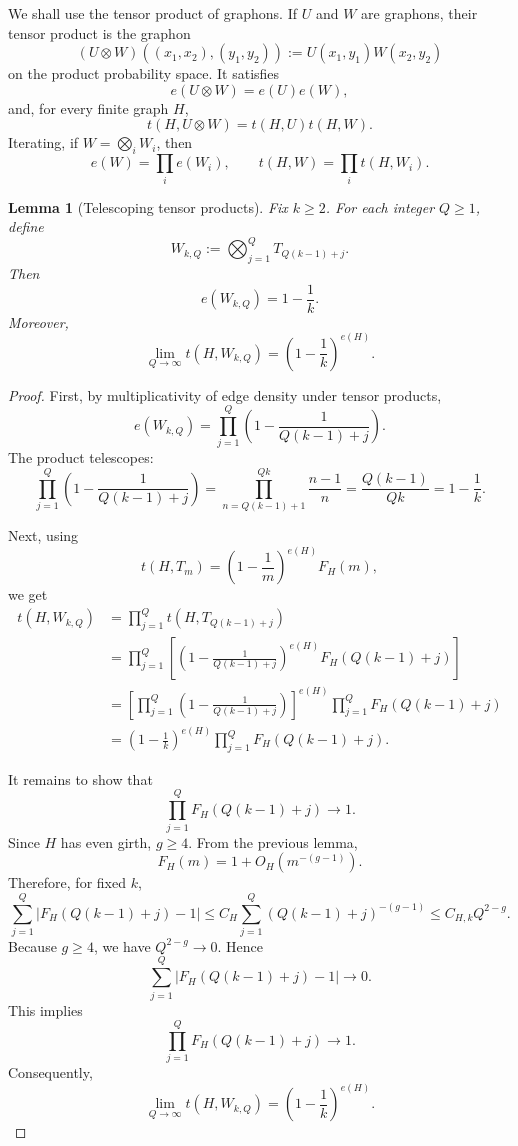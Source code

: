 \documentclass[11pt]{article}
\newtheorem{lemma}{Lemma}
\begin{document}
We shall use the tensor product of graphons.  If \(U\) and \(W\) are
graphons, their tensor product is the graphon
\[
    (U\otimes W)((x_1,x_2),(y_1,y_2))
    :=
    U(x_1,y_1)W(x_2,y_2)
\]
on the product probability space.  It satisfies
\[
    e(U\otimes W)=e(U)e(W),
\]
and, for every finite graph \(H\),
\[
    t(H,U\otimes W)=t(H,U)t(H,W).
\]
Iterating, if \(W=\bigotimes_i W_i\), then
\[
    e(W)=\prod_i e(W_i),
    \qquad
    t(H,W)=\prod_i t(H,W_i).
\]

\begin{lemma}[Telescoping tensor products]
Fix \(k\geq 2\).  For each integer \(Q\geq 1\), define
\[
    W_{k,Q}
    :=
    \bigotimes_{j=1}^{Q}
    T_{Q(k-1)+j}.
\]
Then
\[
    e(W_{k,Q})=1-\frac1k.
\]
Moreover,
\[
    \lim_{Q\to\infty} t(H,W_{k,Q})
    =
    \left(1-\frac1k\right)^{e(H)}.
\]
\end{lemma}

\begin{proof}
First, by multiplicativity of edge density under tensor products,
\[
    e(W_{k,Q})
    =
    \prod_{j=1}^{Q}
    \left(1-\frac{1}{Q(k-1)+j}\right).
\]
The product telescopes:
\[
    \prod_{j=1}^{Q}
    \left(1-\frac{1}{Q(k-1)+j}\right)
    =
    \prod_{n=Q(k-1)+1}^{Qk}
    \frac{n-1}{n}
    =
    \frac{Q(k-1)}{Qk}
    =
    1-\frac1k.
\]

Next, using
\[
    t(H,T_m)
    =
    \left(1-\frac1m\right)^{e(H)}F_H(m),
\]
we get
\[
\begin{aligned}
    t(H,W_{k,Q})
    &=
    \prod_{j=1}^{Q}
    t\!\left(H,T_{Q(k-1)+j}\right)\\
    &=
    \prod_{j=1}^{Q}
    \left[
        \left(
            1-\frac{1}{Q(k-1)+j}
        \right)^{e(H)}
        F_H(Q(k-1)+j)
    \right]\\
    &=
    \left[
        \prod_{j=1}^{Q}
        \left(
            1-\frac{1}{Q(k-1)+j}
        \right)
    \right]^{e(H)}
    \prod_{j=1}^{Q} F_H(Q(k-1)+j)\\
    &=
    \left(1-\frac1k\right)^{e(H)}
    \prod_{j=1}^{Q} F_H(Q(k-1)+j).
\end{aligned}
\]

It remains to show that
\[
    \prod_{j=1}^{Q} F_H(Q(k-1)+j)\to 1.
\]
Since \(H\) has even girth, \(g\geq 4\).  From the previous lemma,
\[
    F_H(m)=1+O_H(m^{-(g-1)}).
\]
Therefore, for fixed \(k\),
\[
    \sum_{j=1}^{Q}
    \left|
        F_H(Q(k-1)+j)-1
    \right|
    \leq
    C_H
    \sum_{j=1}^{Q}
    (Q(k-1)+j)^{-(g-1)}
    \leq
    C_{H,k} Q^{2-g}.
\]
Because \(g\geq 4\), we have \(Q^{2-g}\to 0\).  Hence
\[
    \sum_{j=1}^{Q}
    \left|
        F_H(Q(k-1)+j)-1
    \right|
    \to 0.
\]
This implies
\[
    \prod_{j=1}^{Q} F_H(Q(k-1)+j)\to 1.
\]
Consequently,
\[
    \lim_{Q\to\infty} t(H,W_{k,Q})
    =
    \left(1-\frac1k\right)^{e(H)}.
\]
\end{proof}
\end{document}

